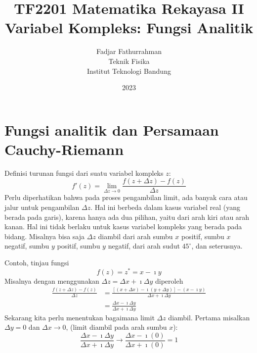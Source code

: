 



\title{%
{\small TF2201 Matematika Rekayasa II}\\
Variabel Kompleks: Fungsi Analitik
}
\author{Fadjar Fathurrahman\\
Teknik Fisika\\
Institut Teknologi Bandung}
\date{2023}
\maketitle



\section{Fungsi analitik dan Persamaan Cauchy-Riemann}


Definisi turunan fungsi dari suatu variabel kompleks $z$:
\begin{equation}
f'(z) = \lim_{\Delta z\rightarrow0}\frac{f(z+\Delta z)-f(z)}{\Delta z}    
\end{equation}
%
Perlu diperhatikan bahwa pada proses pengambilan limit, ada banyak
cara atau jalur untuk pengambilan $\Delta z$. Hal ini berbeda dalam
kasus variabel real (yang berada pada garis), karena hanya ada dua
pilihan, yaitu dari arah kiri atau arah kanan. Hal ini tidak berlaku
untuk kasus variabel kompleks yang berada pada bidang. Misalnya bisa
saja $\Delta z$ diambil dari arah sumbu $x$ positif, sumbu $x$
negatif, sumbu $y$ positif, sumbu $y$ negatif, dari arah sudut $45^{\circ}$,
dan seterusnya.

Contoh, tinjau fungsi
\begin{equation}
f(z)=z^{*}=x-\imath y
\end{equation}
Misalnya dengan menggunakan $\Delta z=\Delta x+\imath\Delta y$ diperoleh
\begin{align*}
\frac{f(z+\Delta z)-f(z)}{\Delta z} & =\frac{\left[(x+\Delta x)-\imath(y+\Delta y)\right]-(x-\imath y)}{\Delta x+\imath\Delta y}\\
 & =\frac{\Delta x-\imath\Delta y}{\Delta x+\imath\Delta y}
\end{align*}
Sekarang kita perlu menentukan bagaimana limit $\Delta z$ diambil.
Pertama misalkan $\Delta y=0$ dan $\Delta x\rightarrow0$, (limit
diambil pada arah sumbu $x$):
\begin{equation*}
\frac{\Delta x-\imath\Delta y}{\Delta x+\imath\Delta y}\rightarrow\frac{\Delta x-\imath(0)}{\Delta x+\imath(0)}=1
\end{equation*}

